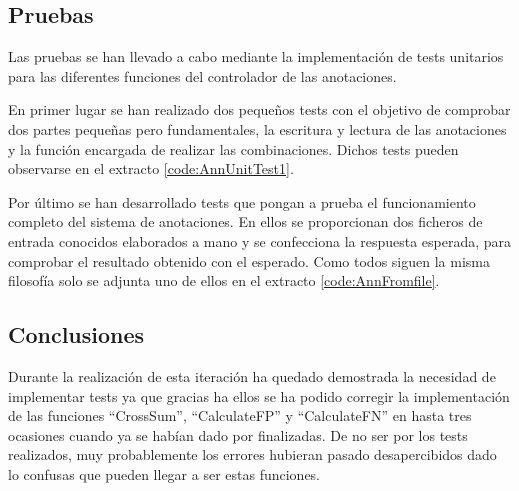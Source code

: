     \subsection{Pruebas}
    
    Las pruebas se han llevado a cabo mediante la implementación de tests unitarios para las diferentes funciones del controlador de las anotaciones. 
    
    En primer lugar se han realizado dos pequeños tests con el objetivo de comprobar dos partes pequeñas pero fundamentales, la escritura y lectura de las anotaciones y la función encargada de realizar las combinaciones. Dichos tests pueden observarse en el extracto \ref{code:AnnUnitTest1}.
    
    
    Por último se han desarrollado tests que pongan a prueba el funcionamiento completo del sistema de anotaciones. En ellos se proporcionan dos ficheros de entrada conocidos elaborados a mano y se confecciona la respuesta esperada, para comprobar el resultado obtenido con el esperado. Como todos siguen la misma filosofía solo se adjunta uno de ellos en el extracto \ref{code:AnnFromfile}.
    
    
    \subsection{Conclusiones}
    
    Durante la realización de esta iteración ha quedado demostrada la necesidad de implementar tests ya que gracias ha ellos se ha podido corregir la implementación de las funciones ``CrossSum'', ``CalculateFP'' y ``CalculateFN'' en hasta tres ocasiones cuando ya se habían dado por finalizadas. De no ser por los tests realizados, muy probablemente los errores hubieran pasado desapercibidos dado lo confusas que pueden llegar a ser estas funciones.
